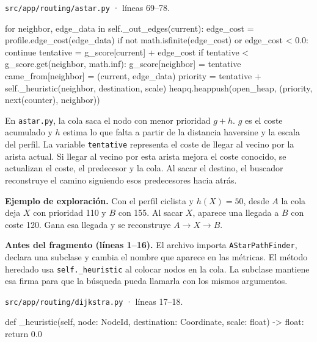 \documentclass[11pt,a4paper]{article}
\begin{document}
\par\medskip
\noindent\begin{minipage}{\linewidth}
{\footnotesize\nolinkurl{src/app/routing/astar.py} · líneas 69--78.\par}
\nopagebreak[4]
\begin{Codigo}[firstnumber=69]
            for neighbor, edge_data in self._out_edges(current):
                edge_cost = profile.edge_cost(edge_data)
                if not math.isfinite(edge_cost) or edge_cost < 0.0:
                    continue
                tentative = g_score[current] + edge_cost
                if tentative < g_score.get(neighbor, math.inf):
                    g_score[neighbor] = tentative
                    came_from[neighbor] = (current, edge_data)
                    priority = tentative + self._heuristic(neighbor, destination, scale)
                    heapq.heappush(open_heap, (priority, next(counter), neighbor))
\end{Codigo}
\end{minipage}\par

En \texttt{astar.py}, la cola saca el nodo con menor prioridad \(g+h\). \(g\) es el coste acumulado y \(h\) estima lo que falta a partir de la distancia haversine y la escala del perfil. La variable \texttt{tentative} representa el coste de llegar al vecino por la arista actual. Si llegar al vecino por esta arista mejora el coste conocido, se actualizan el coste, el predecesor y la cola. Al sacar el destino, el buscador reconstruye el camino siguiendo esos predecesores hacia atrás.

\textbf{Ejemplo de exploración.} Con el perfil ciclista y \(h(X)=50\), desde \(A\) la cola deja \(X\) con prioridad 110 y \(B\) con 155. Al sacar \(X\), aparece una llegada a \(B\) con coste 120. Gana esa llegada y se reconstruye \(A\to X\to B\).

\textbf{Antes del fragmento (líneas 1--16).} El archivo importa \texttt{AStarPathFinder}, declara una subclase y cambia el nombre que aparece en las métricas. El método heredado usa \texttt{self.\_heuristic} al colocar nodos en la cola. La subclase mantiene esa firma para que la búsqueda pueda llamarla con los mismos argumentos.

\par\medskip
\noindent\begin{minipage}{\linewidth}
{\footnotesize\nolinkurl{src/app/routing/dijkstra.py} · líneas 17--18.\par}
\nopagebreak[4]
\begin{Codigo}[firstnumber=17]
    def _heuristic(self, node: NodeId, destination: Coordinate, scale: float) -> float:
        return 0.0
\end{Codigo}
\end{minipage}\par
\end{document}
